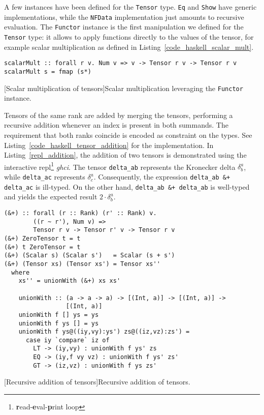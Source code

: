 A few instances have been defined for the \texttt{Tensor} type. \texttt{Eq} and \texttt{Show} have generic implementations, while the \texttt{NFData} implementation just amounts to recursive evaluation. The \texttt{Functor} instance is the first manipulation we defined for the \texttt{Tensor} type: it allows to apply functions directly to the values of the tensor, for example scalar multiplication as defined in Listing~\ref{code_haskell_scalar_mult}.
\begin{code}
  \begin{verbatim}
scalarMult :: forall r v. Num v => v -> Tensor r v -> Tensor r v
scalarMult s = fmap (s*)
  \end{verbatim}
  [Scalar multiplication of tensors]{Scalar multiplication leveraging the \texttt{Functor} instance.}
  \label{code_haskell_scalar_mult}
\end{code}
Tensors of the same rank are added by merging the tensors, performing a recursive addition whenever an index is present in both summands. The requirement that both ranks coincide is encoded as constraint on the types. See Listing~\ref{code_haskell_tensor_addition} for the implementation. In Listing~\ref{repl_addition}, the addition of two tensors is demonstrated using the interactive repl\footnote{\textbf{r}ead-\textbf{e}val-\textbf{p}rint loop} \emph{ghci}. The tensor \texttt{delta_ab} represents the Kronecker delta $\delta^a_b$, while \texttt{delta_ac} represents $\delta^a_c$. Consequently, the expression \texttt{delta_ab &+ delta_ac} is ill-typed. On the other hand, \texttt{delta_ab &+ delta_ab} is well-typed and yields the expected result $2\cdot\delta^a_b$.
\begin{code}
  \begin{verbatim}
(&+) :: forall (r :: Rank) (r' :: Rank) v.
        ((r ~ r'), Num v) =>
        Tensor r v -> Tensor r' v -> Tensor r v
(&+) ZeroTensor t = t
(&+) t ZeroTensor = t
(&+) (Scalar s) (Scalar s')   = Scalar (s + s')
(&+) (Tensor xs) (Tensor xs') = Tensor xs''
  where
    xs'' = unionWith (&+) xs xs'

    unionWith :: (a -> a -> a) -> [(Int, a)] -> [(Int, a)] ->
                 [(Int, a)]
    unionWith f [] ys = ys
    unionWith f ys [] = ys
    unionWith f ys@((iy,vy):ys') zs@((iz,vz):zs') =
      case iy `compare` iz of
        LT -> (iy,vy) : unionWith f ys' zs
        EQ -> (iy,f vy vz) : unionWith f ys' zs'
        GT -> (iz,vz) : unionWith f ys zs'
  \end{verbatim}
  [Recursive addition of tensors]{Recursive addition of tensors.}
  \label{code_haskell_tensor_addition}
\end{code}
